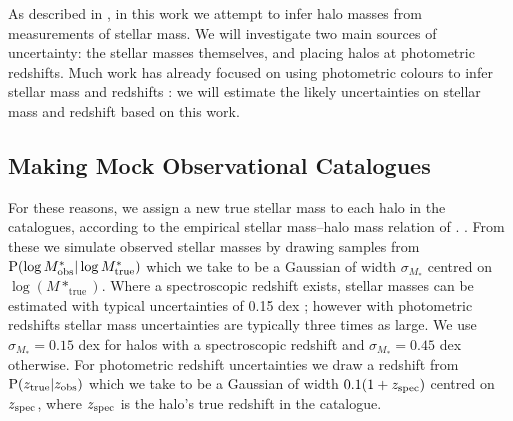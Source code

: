 \documentclass[useAMS,usenatbib,a4paper]{mn2e}
\begin{document}

As described in , in this work we attempt to  infer halo
masses from measurements of stellar mass. We will investigate two main sources
of uncertainty: the stellar masses themselves, and placing halos at
photometric redshifts. Much work has already focused on using photometric
colours to infer stellar mass \citep[\eg][]{AugerEtal2009} and redshifts
\citep[\eg][]{BPZ}: we will estimate the likely uncertainties on stellar mass
and redshift based on this work.  



\subsection{Making Mock Observational Catalogues}

 For these reasons, we assign a new true stellar
mass to each halo in the \MS catalogues, according to the empirical stellar
mass--halo mass relation of \citet{BehrooziEtal2010}. . From these we simulate
observed stellar masses by drawing samples from  ${\rm P}(\log{M^{*}_{\rm
obs}}|\log{M^{*}_{\rm true}})$ which we take to be a Gaussian of width
$\sigma_{M_*}$ centred on $\log(M*_{\mathrm {true}})$. Where a spectroscopic
redshift exists, stellar masses can be estimated with typical uncertainties of
0.15 dex \citep{AugerEtal2009}; however with photometric redshifts stellar
mass uncertainties are typically three times as large. We use
$\sigma_{M_*}=0.15$ dex for halos with a spectroscopic redshift and
$\sigma_{M_*}=0.45$ dex otherwise. For photometric redshift uncertainties we
draw a redshift from ${\rm P}(z_{\rm true}|z_{\rm obs})$ which we take to be a
Gaussian of width $0.1(1+z_{\rm spec})$ centred on $z_{\rm spec}$, where
$z_{\rm spec}$ is the halo's true redshift in the \MS catalogue. 
\end{document}
